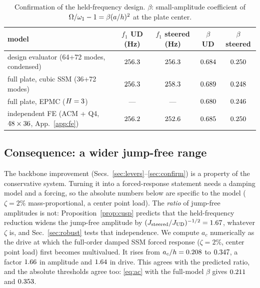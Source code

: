 \begin{table}[!tbp]
\centering\footnotesize
\caption{Confirmation of the held-frequency design. $\beta$: small-amplitude coefficient
of $\Omega/\omega_1-1=\beta(a/h)^2$ at the plate center.}\label{tab:confirm}
\begin{tabular}{@{}lcccc@{}}
\toprule
model & $f_1$ UD (Hz) & $f_1$ steered (Hz) & $\beta$ UD & $\beta$ steered\\ \midrule
design evaluator (64+72 modes, condensed) & $256.3$ & $256.3$ & $0.684$ & $0.250$\\
full plate, cubic SSM (36+72 modes) & $256.3$ & $258.3$ & $0.689$ & $0.248$\\
full plate, EPMC ($H=3$) & --- & --- & $0.680$ & $0.246$\\
independent FE (ACM + Q4, $48\times36$, App.~\ref{app:fe}) & $256.2$ & $252.6$ & $0.685$ & $0.250$\\
\bottomrule
\end{tabular}
\end{table}

\subsection{Consequence: a wider jump-free range}\label{sec:jumpres}
The backbone improvement (Secs.~\ref{sec:levers}--\ref{sec:confirm}) is a property of the
conservative system. Turning it into a forced-response statement needs a damping model and a
forcing, so the absolute numbers below are specific to the model ($\zeta=2\%$ mass-proportional, a
center point load). The \emph{ratio} of jump-free amplitudes is not: Proposition~\ref{prop:cusp}
predicts that the held-frequency reduction widens the jump-free amplitude by
$(J_{\mathrm{steered}}/J_{\mathrm{UD}})^{-1/2}=1.67$, whatever $\zeta$ is, and
Sec.~\ref{sec:robust} tests that independence. We compute
$a_c$ numerically as the drive at which the full-order damped SSM forced response
($\zeta=2\%$, center point load) first becomes multivalued. It rises from $a_c/h=0.208$
to $0.347$, a factor $1.66$ in amplitude and $1.64$ in drive. This agrees
with the predicted ratio, and the absolute thresholds agree too: \eqref{eq:ac} with the
full-model $\beta$ gives $0.211$ and $0.353$.

